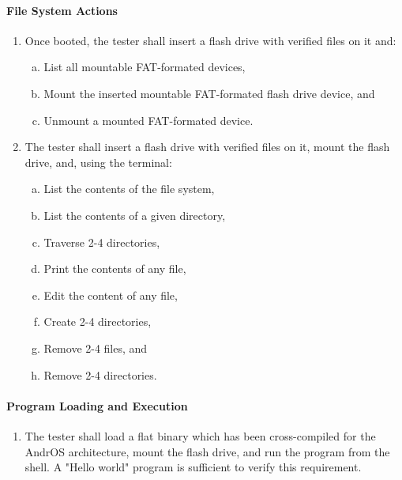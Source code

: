   \paragraph{File System Actions}
  \begin{enumerate}
    \item Once booted, the tester shall insert a flash drive with verified files on it and:
    \begin{enumerate}[(a)]
      \item List all mountable FAT-formated devices, 
      \item Mount the inserted mountable FAT-formated flash drive device, and
      \item Unmount a mounted FAT-formated device.
    \end{enumerate}
    \item The tester shall insert a flash drive with verified files on it, mount the flash drive, and, using the terminal:
    \begin{enumerate}[(a)]
      \item List the contents of the file system,
      \item List the contents of a given directory,
      \item Traverse 2-4 directories,
      \item Print the contents of any file,
      \item Edit the content of any file,
      \item Create 2-4 directories,
      \item Remove 2-4 files, and
      \item Remove 2-4 directories.
    \end{enumerate}
  \end{enumerate}
  \paragraph{Program Loading and Execution}
  \begin{enumerate}
    \item The tester shall load a flat binary which has been cross-compiled for the AndrOS architecture, mount the flash drive, and run the program from the shell. A "Hello world" program is sufficient to verify this requirement.
  \end{enumerate}






